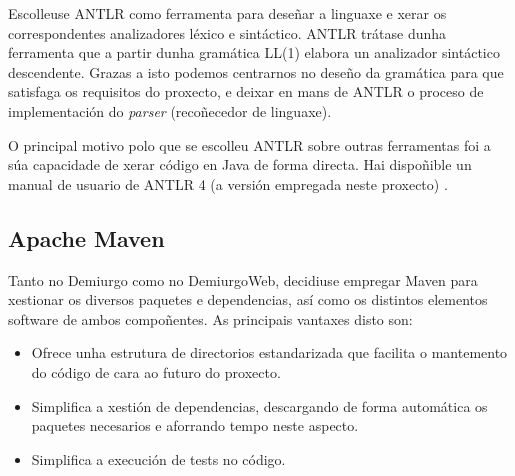 \par
Escolleuse ANTLR como ferramenta para deseñar a linguaxe e xerar os
correspondentes analizadores léxico e sintáctico. ANTLR trátase dunha ferramenta
que a partir dunha gramática LL(1) elabora un analizador sintáctico descendente.
Grazas a isto podemos centrarnos no deseño da gramática para que satisfaga os
requisitos do proxecto, e deixar en mans de ANTLR o proceso de implementación
do \textit{parser} (recoñecedor de linguaxe).
\par
O principal motivo polo que se escolleu ANTLR sobre outras ferramentas foi a súa
capacidade de xerar código en Java de forma directa. Hai dispoñible un manual de
usuario de ANTLR 4 (a versión empregada neste proxecto) \cite{antlr4}.

\subsection{Apache Maven}
Tanto no Demiurgo como no DemiurgoWeb, decidiuse empregar Maven para
xestionar os diversos paquetes e dependencias, así como os distintos elementos
software de ambos compoñentes.
As principais vantaxes disto son:
\begin{itemize}
  \item Ofrece unha estrutura de directorios estandarizada que facilita o
  mantemento do código de cara ao futuro do proxecto.
  \item Simplifica a xestión de dependencias, descargando de forma automática os
  paquetes necesarios e aforrando tempo neste aspecto.
  \item Simplifica a execución de tests no código.
\end{itemize}

